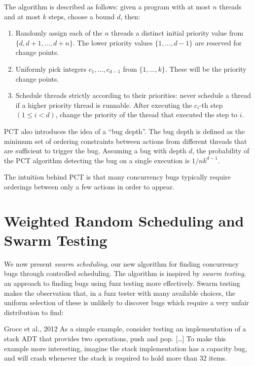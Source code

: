 The algorithm is described as follows\cite{burckhardt2010}: given a program with
at most $n$ threads and at most $k$ steps, choose a bound $d$, then:

\begin{enumerate}
\item Randomly assign each of the $n$ threads a distinct initial priority value
from $\{d, d + 1, \ldots, d+n\}$. The lower priority values $\{1, \ldots, d−1\}$
are reserved for change points.
\item Uniformly pick integers $c_1, \ldots, c_{d−1}$ from $\{1, \ldots,
k\}$. These will be the priority change points.
\item Schedule threads strictly according to their priorities: never
schedule a thread if a higher priority thread is runnable. After executing the
$c_i$-th step $(1 \leq i < d)$, change the priority of the thread that executed
the step to $i$.
\end{enumerate}

PCT also introduces the idea of a ``bug depth''. The bug depth is defined as the
minimum set of ordering constraints between actions from different threads that
are sufficient to trigger the bug\cite{burckhardt2010}. Assuming a bug with
depth $d$, the probability of the PCT algorithm detecting the bug on a single
execution is $1/nk^{d−1}$.

The intuition behind PCT is that many concurrency bugs typically require
orderings between only a few actions in order to appear.

\section{Weighted Random Scheduling and Swarm Testing}
\label{sec:algorithms-swarm}

We now present \emph{swarm scheduling}, our new algorithm for finding
concurrency bugs through controlled scheduling.  The algorithm is inspired
by \emph{swarm testing}\cite{groce2012}, an approach to finding bugs using fuzz
testing more effectively.  Swarm testing makes the observation that, in a fuzz
tester with many available choices, the uniform selection of these is unlikely
to discover bugs which require a very unfair distribution to find:

\begin{bquote}{Groce et al., 2012\nocite{groce2012}}
  As a simple example, consider testing an implementation of a stack ADT that
  provides two operations, push and pop. [\ldots] To make this example more
  interesting, imagine the stack implementation has a capacity bug, and will
  crash whenever the stack is required to hold more than 32
  items.\cite{groce2012}
\end{bquote}

